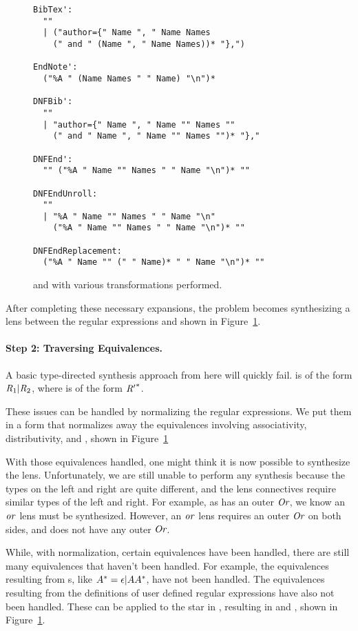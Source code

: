 \documentclass[numbers,10pt,preprint\ifanon ,nocopyrightspace\fi]{sigplanconf}
\begin{document}
\begin{figure}
\begin{lstlisting}
BibTex':
  "" 
  | ("author={" Name ", " Name Names
    (" and " (Name ", " Name Names))* "},")

EndNote':
  ("%A " (Name Names " " Name) "\n")*

DNFBib':
  ""
  | "author={" Name ", " Name "" Names ""
    (" and " Name ", " Name "" Names "")* "},"

DNFEnd':
  "" ("%A " Name "" Names " " Name "\n")* ""

DNFEndUnroll:
  ""
  | "%A " Name "" Names " " Name "\n"
    ("%A " Name "" Names " " Name "\n")* ""

DNFEndReplacement:
  ("%A " Name "" (" " Name)* " " Name "\n")* ""
\end{lstlisting}
  \label{fig:examples-expanded}
  \caption{
     and  with various transformations performed.
  }
\end{figure}
After completing these necessary expansions, the problem becomes synthesizing a
lens between the regular expressions  and  shown in
Figure~\ref{fig:examples-expanded}.

\paragraph*{Step 2:  Traversing Equivalences.}

A basic type-directed synthesis approach from here will quickly fail.
 is of the form $\mathit{R}_1|\mathit{R}_2$, where  is of the form
${\mathit{R}'}^*$.

These issues can be handled by normalizing the regular expressions.
We put them in a form that normalizes away the equivalences involving
associativity, distributivity, and \EmptyString{}, shown in
Figure~\ref{fig:examples-expanded}

With those equivalences handled, one might think it is now possible to
synthesize the lens.
Unfortunately, we are still unable to perform any synthesis because the types
on the left and right are quite different, and the lens connectives require
similar types of the left and right.
For example, as  has an outer $\textit{Or}$, we know an $\mathit{or}$ lens must be
synthesized.
However, an $\mathit{or}$ lens requires an outer $\textit{Or}$ on both sides, and  does
not have any outer $\textit{Or}$.

While, with normalization, certain equivalences have been handled, there are
still many equivalences that haven't been handled.
For example, the equivalences resulting from \StarRegexType{}s, like
${A}^*=\epsilon | A{A}^*$, have not been handled.
The equivalences resulting from the definitions of user defined regular
expressions have also not been handled. These can be applied to the star in
, resulting in  and , shown in
Figure~\ref{fig:examples-expanded}.
\end{document}
